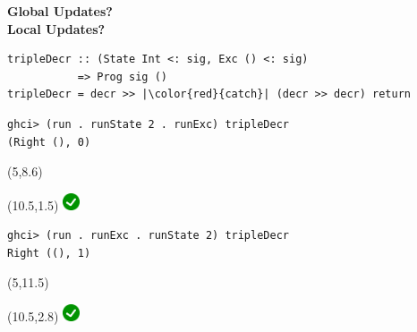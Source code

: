 \documentclass[xcolor=pdftex,dvipsnames,table]{beamer}
\def\checkmark{\includegraphics[height=0.5cm]{checkmark}}
\begin{document}
\begin{frame}[fragile, t]
  \begin{center}
    \textbf{\Large{Global Updates?}} \\
    \textbf{\Large{Local Updates?}}
  \end{center}

  \begin{verbatim}
tripleDecr :: (State Int <: sig, Exc () <: sig)
           => Prog sig ()
tripleDecr = decr >> |\color{red}{catch}| (decr >> decr) return
  \end{verbatim}

  \begin{verbatim}
ghci> (run . runState 2 . runExc) tripleDecr
(Right (), 0)
  \end{verbatim}

  {
    \begin{textblock}{4}(5,8.6)
      \begin{center}
        \footnotesize\textbf{\color{White}{global update}}
      \end{center}
    \end{textblock}
  }

  {
    \begin{textblock}{2}(10.5,1.5)
      \checkmark
    \end{textblock}
  }

  \bigskip

  \begin{verbatim}
ghci> (run . runExc . runState 2) tripleDecr
Right ((), 1)
  \end{verbatim}

  {
    \begin{textblock}{4}(5,11.5)
      \begin{center}
        \footnotesize\textbf{\color{White}{local update}}
      \end{center}
    \end{textblock}
  }

  {
    \begin{textblock}{2}(10.5,2.8)
      \checkmark
    \end{textblock}
  }

\end{frame}


\begin{thebibliography}{5}
\end{thebibliography}

\end{document}
